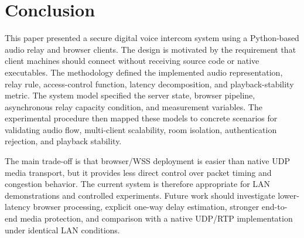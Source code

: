 \documentclass[conference]{IEEEtran}
\begin{document}
\section{Conclusion}

This paper presented a secure digital voice intercom system using a Python-based audio relay and browser clients. The design is motivated by the requirement that client machines should connect without receiving source code or native executables. The methodology defined the implemented audio representation, relay rule, access-control function, latency decomposition, and playback-stability metric. The system model specified the server state, browser pipeline, asynchronous relay capacity condition, and measurement variables. The experimental procedure then mapped these models to concrete scenarios for validating audio flow, multi-client scalability, room isolation, authentication rejection, and playback stability.

The main trade-off is that browser/WSS deployment is easier than native UDP media transport, but it provides less direct control over packet timing and congestion behavior. The current system is therefore appropriate for LAN demonstrations and controlled experiments. Future work should investigate lower-latency browser processing, explicit one-way delay estimation, stronger end-to-end media protection, and comparison with a native UDP/RTP implementation under identical LAN conditions.



\end{document}
